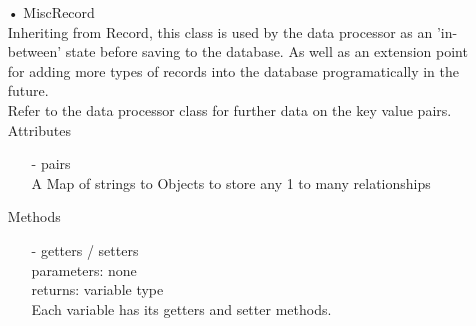 \documentclass[oneside, english, final]{design}
\begin{document}
\begin{itemize}
	\item[•]MiscRecord
	      \\Inheriting from Record, this class is used by the data processor as an 'in-between' state before saving to the database. As well as an extension point for adding more types of records into the database programatically in the future.
	      \\Refer to the data processor class for further data on the key value pairs.
	      \\Attributes
	      \begin{itemize}
		      \item[-] pairs
		            \\ A Map of strings to Objects to store any 1 to many relationships
	      \end{itemize}
	      Methods
	      \begin{itemize}
		      \item[-]getters / setters
		            \\parameters: none
		            \\returns: variable type
		            \\Each variable has its getters and setter methods.
	      \end{itemize}


\end{itemize}
\end{document}
